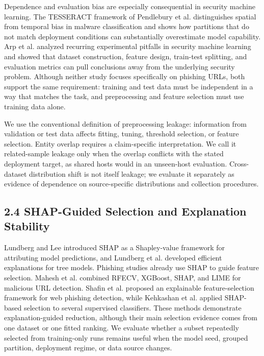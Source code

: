 \documentclass[
  10pt,
]{article}
\begin{document}
Dependence and evaluation bias are especially consequential in security
machine learning. The TESSERACT framework of Pendlebury et
al.\citep{Pendlebury2019} distinguishes spatial from temporal bias in
malware classification and shows how partitions that do not match
deployment conditions can substantially overestimate model capability.
Arp et al.\citep{Arp2022} analyzed recurring experimental pitfalls in
security machine learning and showed that dataset construction, feature
design, train-test splitting, and evaluation metrics can pull
conclusions away from the underlying security problem. Although neither
study focuses specifically on phishing URLs, both support the same
requirement: training and test data must be independent in a way that
matches the task, and preprocessing and feature selection must use
training data alone.

We use the conventional definition of preprocessing leakage: information
from validation or test data affects fitting, tuning, threshold
selection, or feature selection. Entity overlap requires a
claim-specific interpretation. We call it related-sample leakage only
when the overlap conflicts with the stated deployment target, as shared
hosts would in an unseen-host evaluation. Cross-dataset distribution
shift is not itself leakage; we evaluate it separately as evidence of
dependence on source-specific distributions and collection procedures.

\subsection{2.4 SHAP-Guided Selection and Explanation
Stability}\label{shap-guided-selection-and-explanation-stability}

Lundberg and Lee\citep{Lundberg2017} introduced SHAP as a Shapley-value
framework for attributing model predictions, and Lundberg et
al.\citep{Lundberg2020} developed efficient explanations for tree
models. Phishing studies already use SHAP to guide feature selection.
Mahesh et al.\citep{Mahesh2026} combined RFECV, XGBoost, SHAP, and LIME
for malicious URL detection. Shafin et al.\citep{Shafin2025} proposed an
explainable feature-selection framework for web phishing detection,
while Kehkashan et al.\citep{Kehkashan2025} applied SHAP-based selection
to several supervised classifiers. These methods demonstrate
explanation-guided reduction, although their main selection evidence
comes from one dataset or one fitted ranking. We evaluate whether a
subset repeatedly selected from training-only runs remains useful when
the model seed, grouped partition, deployment regime, or data source
changes.
\end{document}

